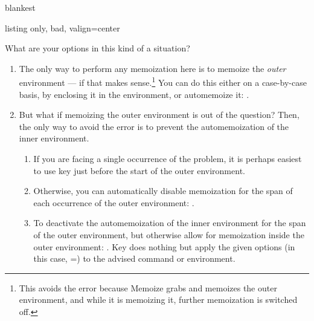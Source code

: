 \documentclass[a4paper,11pt]{article}
\begin{document}
\begingroup
{}
\begin{tcboxedraster}{blankest}
\begin{tcblisting}{listing only, bad, valign=center}
\newenvironment{foo}%
{%
  \begin{tikzpicture}
}
{%
  \end{tikzpicture}
}  
\end{tcblisting}
\end{tcboxedraster}
\endgroup

What are your options in this kind of a situation?
\begin{enumerate}
\item The only way to perform any memoization here is to memoize the
  \emph{outer} environment --- if that makes sense.\footnote{This avoids the
    error because Memoize grabs and memoizes the outer environment, and while
    it is memoizing it, further memoization is switched off.}  You can do this
  either on a case-by-case basis, by enclosing it in the 
  environment, or automemoize it: .  
\item But what if memoizing the outer environment is out of the question?
  Then, the only way to avoid the error is to prevent the automemoization of
  the inner environment.
  \begin{enumerate}
  \item If you are facing a single occurrence of the problem, it is perhaps
    easiest to use key  just before the start of the outer
    environment.
  \item Otherwise, you can automatically disable memoization for the span of
    each occurrence of the outer environment: .
  \item To deactivate the automemoization of the inner environment for the span
    of the outer environment, but otherwise allow for memoization inside the
    outer environment: . Key  does nothing but apply the
    given options (in this case, =)
    to the advised command or environment.
  \end{enumerate}
\end{enumerate}
\end{document}
